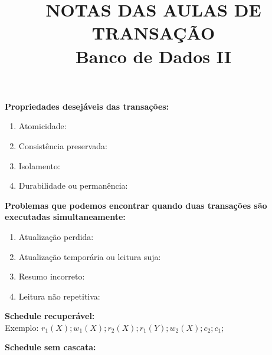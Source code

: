 \documentclass[a4paper]{scrartcl}
\title{\vspace{-2cm}NOTAS DAS AULAS DE TRANSAÇÃO \\ Banco de Dados II\vspace{-1.5cm}}
\author{}\date{}
\theoremstyle{remark}
\theoremstyle{definition}
\begin{document}
\maketitle

\textbf{Propriedades desejáveis das transações:}
\begin{enumerate}
    \item Atomicidade:
    \item Consistência preservada:
    \item Isolamento:
    \item Durabilidade ou permanência:
\end{enumerate}

\textbf{Problemas que podemos encontrar quando duas transações são executadas simultaneamente:}
\begin{enumerate}
    \item Atualização perdida:
    \item Atualização temporária ou leitura suja:
    \item Resumo incorreto:
    \item Leitura não repetitiva:
\end{enumerate}

\textbf{Schedule recuperável:}\\

Exemplo: $r_1(X); w_1(X); r_2(X); r_1(Y); w_2(X); c_2; c_1;$

\textbf{Schedule sem cascata:}\\
\end{document}
